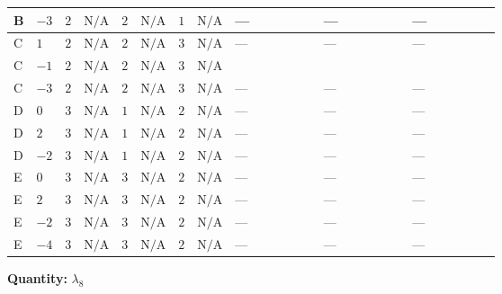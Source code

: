 \documentclass[8pt]{article}
\begin{document}
\begin{landscape}
\begin{longtable}{@{}llcccccc >{\raggedright\arraybackslash}p{0.21\linewidth} >{\raggedright\arraybackslash}p{0.21\linewidth} >{\raggedright\arraybackslash}p{0.21\linewidth}@{}}
\midrule
B & $-3$ & $2$ & $\text{N/A}$ & $2$ & $\text{N/A}$ & $1$ & $\text{N/A}$ & --- & --- & --- \\
\midrule
C & $1$ & $2$ & $\text{N/A}$ & $2$ & $\text{N/A}$ & $3$ & $\text{N/A}$ & --- & --- & --- \\
\midrule
C & $-1$ & $2$ & $\text{N/A}$ & $2$ & $\text{N/A}$ & $3$ & $\text{N/A}$ & \scriptsize\adjustbox{max width=\linewidth}{$\begin{gathered} -3 {g_1}^2 {\lambda_{8}}\end{gathered}$} & \scriptsize\adjustbox{max width=\linewidth}{$\begin{gathered} +2 {\lambda_1} {\lambda_{8}}\end{gathered}$} & \scriptsize\adjustbox{max width=\linewidth}{$\begin{gathered} +8 {\lambda_{HS_2}^{(1)}} {\lambda_{8}}\end{gathered}$} \\
\midrule
C & $-3$ & $2$ & $\text{N/A}$ & $2$ & $\text{N/A}$ & $3$ & $\text{N/A}$ & --- & --- & --- \\
\midrule
D & $0$ & $3$ & $\text{N/A}$ & $1$ & $\text{N/A}$ & $2$ & $\text{N/A}$ & --- & --- & --- \\
\midrule
D & $2$ & $3$ & $\text{N/A}$ & $1$ & $\text{N/A}$ & $2$ & $\text{N/A}$ & --- & --- & --- \\
\midrule
D & $-2$ & $3$ & $\text{N/A}$ & $1$ & $\text{N/A}$ & $2$ & $\text{N/A}$ & --- & --- & --- \\
\midrule
E & $0$ & $3$ & $\text{N/A}$ & $3$ & $\text{N/A}$ & $2$ & $\text{N/A}$ & --- & --- & --- \\
\midrule
E & $2$ & $3$ & $\text{N/A}$ & $3$ & $\text{N/A}$ & $2$ & $\text{N/A}$ & --- & --- & --- \\
\midrule
E & $-2$ & $3$ & $\text{N/A}$ & $3$ & $\text{N/A}$ & $2$ & $\text{N/A}$ & --- & --- & --- \\
\midrule
E & $-4$ & $3$ & $\text{N/A}$ & $3$ & $\text{N/A}$ & $2$ & $\text{N/A}$ & --- & --- & --- \\
\midrule
\bottomrule
\end{longtable}
\clearpage
\noindent\textbf{Quantity: }$\lambda_{8}$\par\smallskip

\end{landscape}
\end{document}
